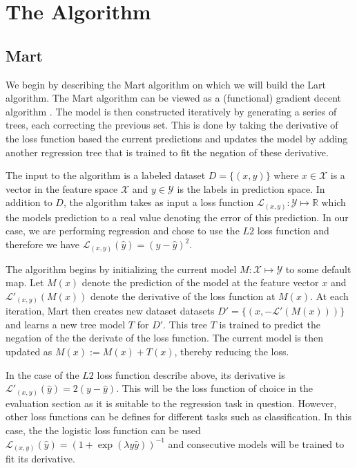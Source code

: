 \documentclass{article} %
\begin{document}
\section{The Algorithm} \label{sec:algo}

\subsection{Mart}
We begin by describing the Mart algorithm on which we will build the Lart algorithm. The Mart algorithm can be viewed as a (functional) gradient decent algorithm \cite{friedman2001}. The model is then constructed iteratively by generating a series of trees, each correcting the previous set. This is done by taking the derivative of the loss function based the current predictions and updates the model by adding another regression tree that is trained to fit the negation of these derivative. 

The input to the algorithm is a labeled dataset $D=\{(x,y)\}$ where $x\in \mathcal{X}$ is a vector in the feature space $\mathcal{X}$ and $y\in \mathcal{Y}$ is the labels in prediction space. In addition to $D$, the algorithm takes as input a loss function $\mathcal{L}_{(x,y)} :  \mathcal{Y} \mapsto \mathds{R} $ which the models prediction to a real value denoting the error of this prediction. In our case, we are performing regression and chose to use the $L2$ loss function and therefore we have $\mathcal{L}_{(x,y)}(\hat{y} ) = (y- \hat{y})^2$.
 
 
The algorithm begins by initializing the current model $M:\mathcal{X}\mapsto \mathcal{Y}$ to some default map. Let $M(x)$ denote the prediction of the model at the feature vector $x$ and $\mathcal{L}'_{(x,y)}(M(x))$ denote the derivative of the loss function at $M(x)$. At each iteration, Mart then creates new dataset datasets $D'=\{(x,-\mathcal{L}'(M(x)))\}$  and learns a new tree model $T$ for $D'$. This tree $T$ is trained to predict the negation of the the derivate of the loss function. The current model is then updated as $M(x):= M(x) + T(x)$, thereby reducing the loss.

In the case of the $L2$ loss function describe above, its derivative is $\mathcal{L}'_{(x,y)}(\hat{y}) = 2(y - \hat{y})$. This will be the loss function of choice in the evaluation section as it is suitable to the regression task in question. However, other loss functions can be defines for different tasks such as classification. In this case, the  the logistic loss function can be used $\mathcal{L}_{(x,y)} (\hat{y}) =( 1 + \exp(\lambda y \hat{y}))^{-1}$ and consecutive models will be trained to fit its derivative.
\end{document}
